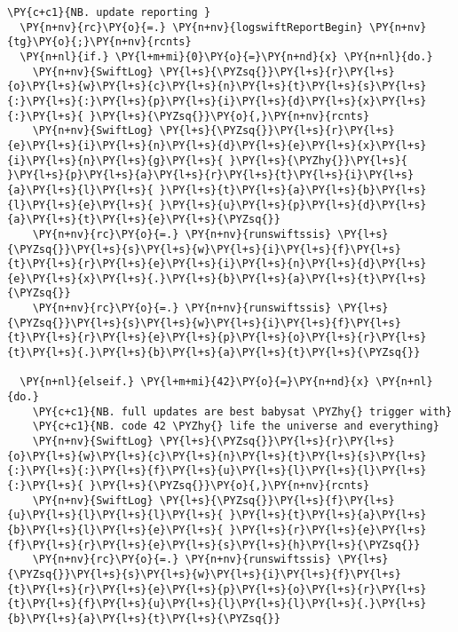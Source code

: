 \begin{tcolorbox}[breakable, size=fbox, boxrule=1pt, pad at break*=1mm,colback=cellbackground, colframe=cellborder]
\begin{Verbatim}[commandchars=\\\{\}]
  \PY{c+c1}{NB. update reporting }
  \PY{n+nv}{rc}\PY{o}{=.} \PY{n+nv}{logswiftReportBegin} \PY{n+nv}{tg}\PY{o}{;}\PY{n+nv}{rcnts}
  \PY{n+nl}{if.} \PY{l+m+mi}{0}\PY{o}{=}\PY{n+nd}{x} \PY{n+nl}{do.}
    \PY{n+nv}{SwiftLog} \PY{l+s}{\PYZsq{}}\PY{l+s}{r}\PY{l+s}{o}\PY{l+s}{w}\PY{l+s}{c}\PY{l+s}{n}\PY{l+s}{t}\PY{l+s}{s}\PY{l+s}{:}\PY{l+s}{:}\PY{l+s}{p}\PY{l+s}{i}\PY{l+s}{d}\PY{l+s}{x}\PY{l+s}{:}\PY{l+s}{ }\PY{l+s}{\PYZsq{}}\PY{o}{,}\PY{n+nv}{rcnts} 
    \PY{n+nv}{SwiftLog} \PY{l+s}{\PYZsq{}}\PY{l+s}{r}\PY{l+s}{e}\PY{l+s}{i}\PY{l+s}{n}\PY{l+s}{d}\PY{l+s}{e}\PY{l+s}{x}\PY{l+s}{i}\PY{l+s}{n}\PY{l+s}{g}\PY{l+s}{ }\PY{l+s}{\PYZhy{}}\PY{l+s}{ }\PY{l+s}{p}\PY{l+s}{a}\PY{l+s}{r}\PY{l+s}{t}\PY{l+s}{i}\PY{l+s}{a}\PY{l+s}{l}\PY{l+s}{ }\PY{l+s}{t}\PY{l+s}{a}\PY{l+s}{b}\PY{l+s}{l}\PY{l+s}{e}\PY{l+s}{ }\PY{l+s}{u}\PY{l+s}{p}\PY{l+s}{d}\PY{l+s}{a}\PY{l+s}{t}\PY{l+s}{e}\PY{l+s}{\PYZsq{}}
    \PY{n+nv}{rc}\PY{o}{=.} \PY{n+nv}{runswiftssis} \PY{l+s}{\PYZsq{}}\PY{l+s}{s}\PY{l+s}{w}\PY{l+s}{i}\PY{l+s}{f}\PY{l+s}{t}\PY{l+s}{r}\PY{l+s}{e}\PY{l+s}{i}\PY{l+s}{n}\PY{l+s}{d}\PY{l+s}{e}\PY{l+s}{x}\PY{l+s}{.}\PY{l+s}{b}\PY{l+s}{a}\PY{l+s}{t}\PY{l+s}{\PYZsq{}}
    \PY{n+nv}{rc}\PY{o}{=.} \PY{n+nv}{runswiftssis} \PY{l+s}{\PYZsq{}}\PY{l+s}{s}\PY{l+s}{w}\PY{l+s}{i}\PY{l+s}{f}\PY{l+s}{t}\PY{l+s}{r}\PY{l+s}{e}\PY{l+s}{p}\PY{l+s}{o}\PY{l+s}{r}\PY{l+s}{t}\PY{l+s}{.}\PY{l+s}{b}\PY{l+s}{a}\PY{l+s}{t}\PY{l+s}{\PYZsq{}}

  \PY{n+nl}{elseif.} \PY{l+m+mi}{42}\PY{o}{=}\PY{n+nd}{x} \PY{n+nl}{do.}
    \PY{c+c1}{NB. full updates are best babysat \PYZhy{} trigger with}
    \PY{c+c1}{NB. code 42 \PYZhy{} life the universe and everything}
    \PY{n+nv}{SwiftLog} \PY{l+s}{\PYZsq{}}\PY{l+s}{r}\PY{l+s}{o}\PY{l+s}{w}\PY{l+s}{c}\PY{l+s}{n}\PY{l+s}{t}\PY{l+s}{s}\PY{l+s}{:}\PY{l+s}{:}\PY{l+s}{f}\PY{l+s}{u}\PY{l+s}{l}\PY{l+s}{l}\PY{l+s}{:}\PY{l+s}{ }\PY{l+s}{\PYZsq{}}\PY{o}{,}\PY{n+nv}{rcnts} 
    \PY{n+nv}{SwiftLog} \PY{l+s}{\PYZsq{}}\PY{l+s}{f}\PY{l+s}{u}\PY{l+s}{l}\PY{l+s}{l}\PY{l+s}{ }\PY{l+s}{t}\PY{l+s}{a}\PY{l+s}{b}\PY{l+s}{l}\PY{l+s}{e}\PY{l+s}{ }\PY{l+s}{r}\PY{l+s}{e}\PY{l+s}{f}\PY{l+s}{r}\PY{l+s}{e}\PY{l+s}{s}\PY{l+s}{h}\PY{l+s}{\PYZsq{}}
    \PY{n+nv}{rc}\PY{o}{=.} \PY{n+nv}{runswiftssis} \PY{l+s}{\PYZsq{}}\PY{l+s}{s}\PY{l+s}{w}\PY{l+s}{i}\PY{l+s}{f}\PY{l+s}{t}\PY{l+s}{r}\PY{l+s}{e}\PY{l+s}{p}\PY{l+s}{o}\PY{l+s}{r}\PY{l+s}{t}\PY{l+s}{f}\PY{l+s}{u}\PY{l+s}{l}\PY{l+s}{l}\PY{l+s}{.}\PY{l+s}{b}\PY{l+s}{a}\PY{l+s}{t}\PY{l+s}{\PYZsq{}}


\end{Verbatim}
\end{tcolorbox}
